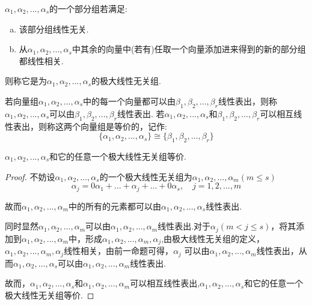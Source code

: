 \documentclass[blue,normal,cn]{elegantnote}
\begin{document}
\begin{definition}
    $α_1,α_2,...,α_s$的一个部分组若满足:
    \begin{enumerate}[(a)]
        \item 该部分组线性无关.
        \item 从$α_1,α_2,...,α_s$中其余的向量中(若有)任取一个向量添加进来得到的新的部分组都线性相关.
    \end{enumerate}
    则称它是为$α_1,α_2,...,α_s$的极大线性无关组.
\end{definition}

\begin{definition}
    若向量组$α_1,α_2,...,α_s$中的每一个向量都可以由$β_1,β_2,...,β_r$线性表出，则称$α_1,α_2,...,α_s$可以由$β_1,β_2,...,β_r$线性表出.
    若$α_1,α_2,...,α_s$和$β_1,β_2,...,β_r$可以相互线性表出，则称这两个向量组是等价的，记作:
    $$
        \{α_1,α_2,...,α_s\} \cong \{β_1,β_2,...,β_r\}
    $$
\end{definition}

\begin{proposition}
    $α_1,α_2,...,α_s$和它的任意一个极大线性无关组等价.
\end{proposition}

\begin{proof}
    不妨设$α_1,α_2,...,α_s$的一个极大线性无关组为$α_1,α_2,...,α_m(m≤s)$
    $$
        α_j=0α_1+...+α_j+...+0α_s,\quad j=1,2,...,m
    $$

    故而$α_1,α_2,...,α_m$中的所有的元素都可以由$α_1,α_2,...,α_s$线性表出.

    同时显然$α_1,α_2,...,α_m$可以由$α_1,α_2,...,α_m$线性表出.对于$α_j(m<j≤s)$，将其添加到$α_1,α_2,...,α_m$中，形成$α_1,α_2,...,α_m,α_j$,由极大线性无关组的定义，$α_1,α_2,...,α_m,α_j$线性相关，由前一命题可得，$α_j$
    可以由$α_1,α_2,...,α_m$线性表出，从而$α_1,α_2,...,α_s$可以由$α_1,α_2,...,α_m$线性表出.

    故而，$α_1,α_2,...,α_s$和$α_1,α_2,...,α_m$可以相互线性表出,$α_1,α_2,...,α_s$和它的任意一个极大线性无关组等价.
\end{proof}
\end{document}

